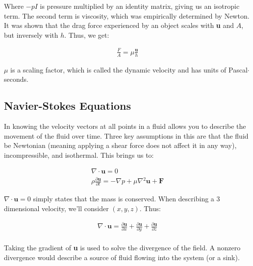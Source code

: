 \documentclass[12pt]{report}
\begin{document}
Where $-pI$ is pressure multiplied by an identity matrix, giving us an isotropic term. The second term is viscosity, which was empirically determined by Newton. It was shown that the drag force experienced by an object scales with \textbf{u} and $A$, but inversely with $h$. Thus, we get:

\begin{equation} \label{phenom1}
\begin{split}
\frac{F}{A} = \mu \frac{\mathbf{u}}{h} 
\end{split}
\end{equation}

$\mu$ is a scaling factor, which is called the dynamic velocity and has units of Pascal$\cdot$seconds. 

\subsection{Navier-Stokes Equations}

\label{sec:imstoked}

In knowing the velocity vectors at all points in a fluid allows you to describe the movement of the fluid over time. Three key assumptions in this are that the fluid be Newtonian (meaning applying a shear force does not affect it in any way), incompressible, and isothermal. This brings us to:

\begin{equation} \label{NS1}
\begin{split}
\nabla \cdot \mathbf{u} = 0 \\
\rho \frac{\partial \mathbf{u}}{\partial t}= -\nabla p + \mu \nabla{}^2\mathbf{u} + \mathbf{F} 
\end{split}
\end{equation}

$\nabla \cdot \mathbf{u} = 0$ simply states that the mass is conserved. When describing a 3 dimensional velocity, we'll consider $(x,y,z)$. Thus:

\begin{equation} \label{NS2}
\begin{split}
\nabla \cdot \mathbf{u} =  \frac{\partial \textbf{u}}{\partial x} + \frac{\partial \textbf{u}}{\partial y} + \frac{\partial \textbf{u}}{\partial z}\\
\end{split}
\end{equation}

Taking the gradient of \textbf{u} is used to solve the divergence of the field. A nonzero divergence would describe a source of fluid flowing into the system (or a sink).\newline
\end{document}
